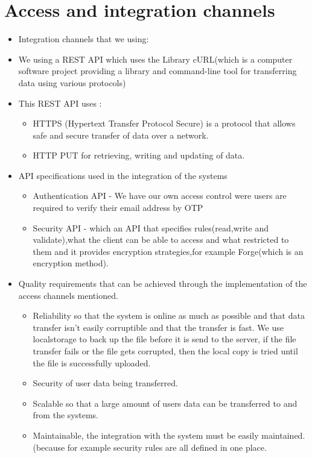 \documentclass[a4paper,12pt]{article}
\begin{document}
\section{Access and integration channels}
\begin{itemize}
\item Integration channels that we using:
\item We using a REST API which uses the Library cURL(which is a computer software project providing a library and command-line tool for transferring data using various protocols)

\item This REST API uses : 
\begin{itemize}
\item HTTPS (Hypertext Transfer Protocol Secure) is a protocol that allows safe and secure transfer of data over a network.
\item HTTP PUT for retrieving, writing and updating of data.
\end{itemize}

\item API specifications used in the integration of the systems
\begin{itemize}
\item Authentication API - We have our own access control were users are required to verify their email address by OTP
\item Security API - which an API that specifies rules(read,write and validate),what the client can be able to access and what restricted to them and it provides encryption strategies,for example Forge(which is an encryption method).
\end{itemize}

\item Quality requirements that can be achieved through the implementation of the access channels mentioned.
\begin{itemize}
\item Reliability so that the system is online as much as possible and that data transfer isn’t easily corruptible and that the transfer is fast. We use localstorage to back up the file before it is send to the server, if the file transfer fails or the file gets corrupted, then the local copy is tried until the file is successfully uploaded.

\item Security of user data being transferred.

\item Scalable so that a large amount of users data can be transferred to and from the systems.

\item Maintainable, the integration with the system must be easily maintained. (because for example security rules are all defined in one place.
\end{itemize}
\end{itemize}
\end{document}
